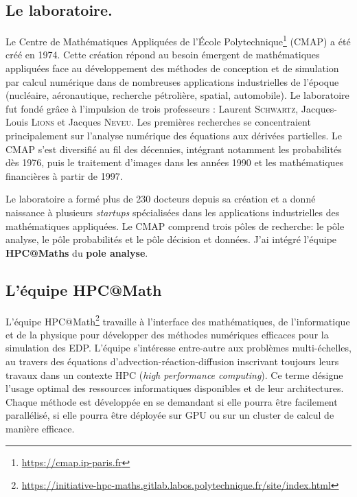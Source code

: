 \subsection{Le laboratoire.}
Le Centre de Mathématiques Appliquées de l'École Polytechnique\footnote{\href{https://cmap.ip-paris.fr}{https://cmap.ip-paris.fr}} (CMAP) a été créé en 1974.
Cette création répond au besoin émergent de mathématiques appliquées face au développement des méthodes de conception et de simulation par calcul numérique dans de nombreuses applications industrielles de l'époque (nucléaire, aéronautique, recherche pétrolière, spatial, automobile).
Le laboratoire fut fondé grâce à l'impulsion de trois professeurs : Laurent \textsc{Schwartz}, Jacques-Louis \textsc{Lions} et Jacques \textsc{Neveu}.
Les premières recherches se concentraient principalement sur l'analyse numérique des équations aux dérivées partielles.
Le CMAP s'est diversifié au fil des décennies, intégrant notamment les probabilités dès 1976, puis le traitement d'images dans les années 1990 et les mathématiques financières à partir de 1997. 

Le laboratoire a formé plus de 230 docteurs depuis sa création et a donné naissance à plusieurs \textit{startups} spécialisées dans les applications industrielles des mathématiques appliquées.
Le CMAP comprend trois pôles  de recherche: le pôle analyse, le pôle probabilités et le pôle décision et données.
J'ai intégré l'équipe \textbf{HPC@Maths} du \textbf{pole analyse}.
\subsection{L'équipe HPC@Math}
    L'équipe HPC@Math\footnote{\href{https://initiative-hpc-maths.gitlab.labos.polytechnique.fr/site/index.html}{https://initiative-hpc-maths.gitlab.labos.polytechnique.fr/site/index.html}} 
    travaille à l'interface des mathématiques, de l'informatique et de la physique pour développer 
    des méthodes numériques efficaces pour la simulation des EDP. 
    L'équipe s'intéresse entre-autre aux problèmes multi-échelles, au travers des équations d'advection-réaction-diffusion
    inscrivant toujours leurs travaux dans un contexte HPC (\emph{high performance computing}).
    Ce terme désigne l'usage optimal des ressources informatiques disponibles et de leur architectures. 
    Chaque méthode est développée en se demandant si elle pourra être facilement parallélisé, si elle pourra être déployée sur GPU ou sur un cluster de calcul de manière efficace. 